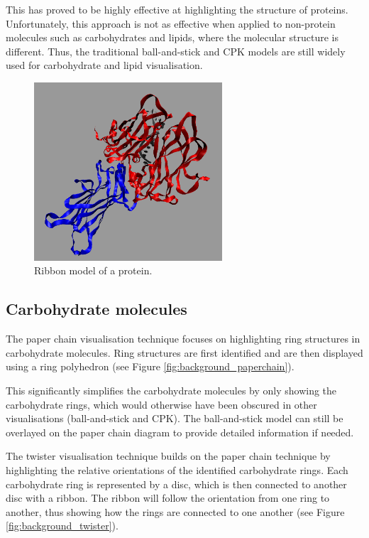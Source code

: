 This has proved to be highly effective at highlighting the structure of
proteins.  Unfortunately, this approach is not as effective when applied to
non-protein molecules such as carbohydrates and lipids, where the molecular
structure is different. Thus, the traditional ball-and-stick and CPK models are
still widely used for carbohydrate and lipid visualisation.

\begin{figure}[h!]
  \begin{center}
    \includegraphics[width=70mm]{ribbon}
  \end{center}
  \caption{Ribbon model of a protein.}
  \label{fig:background_ribbon}
\end{figure}


\subsection{Carbohydrate molecules}
\label{sub:background_carbohydrate}

The paper chain visualisation technique \citep{kuttel06} focuses on
highlighting ring structures in carbohydrate molecules. Ring structures are
first identified and are then displayed using a ring polyhedron (see Figure
\ref{fig:background_paperchain}).

This significantly simplifies the carbohydrate molecules by only showing the
carbohydrate rings, which would otherwise have been obscured in other
visualisations (ball-and-stick and CPK). The ball-and-stick model can still be
overlayed on the paper chain diagram to provide detailed information if needed.

The twister visualisation technique \citep{kuttel06} builds on the paper chain
technique by highlighting the relative orientations of the identified
carbohydrate rings. Each carbohydrate ring is represented by a disc, which is
then connected to another disc with a ribbon. The ribbon will follow the
orientation from one ring to another, thus showing how the rings are connected
to one another (see Figure \ref{fig:background_twister}).

